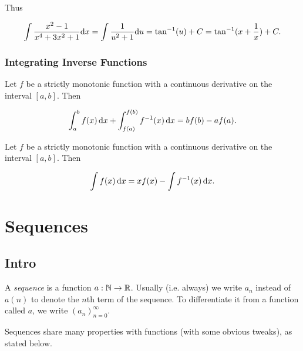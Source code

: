 \documentclass{article}
\begin{document}
{\begin{eg}
      Thus 

      \[
        \int \frac{x^2-1}{x^4+3x^2+1} \mathrm{d} x = \int \frac{1}{u^2 + 1} \mathrm{d} u = \tan^{-1}(u) + C = \tan^{-1}(x + \frac{1}{x}) + C.
      \]
    \end{eg}
    
    \subsubsection*{Integrating Inverse Functions}
    \begin{thm} Let \(f\) be a strictly monotonic function with a continuous derivative on the interval \([a,b]\). Then 

      \[
        \int_{a}^{b}f(x) \, \mathrm{d} x + \int_{f(a)}^{f(b)}f^{-1}(x) \, \mathrm{d} x = bf(b) - af(a).
      \]
    \end{thm}

    \begin{thm} Let \(f\) be a strictly monotonic function with a continuous derivative on the interval \([a,b]\). Then 

      \[
        \int f(x) \, \mathrm{d} x = xf(x) - \int f^{-1}(x) \, \mathrm{d} x.
      \]
      
    \end{thm}

  }

  \pagebreak

  \section{Sequences}
  \subsection{Intro}

  \begin{defi}[Sequence]
    A \emph{sequence} is a function \(a: \mathbb{N} \to \mathbb{R}\). Usually (i.e. always) we write \(a_n\) instead of \(a(n)\) to denote the \(n\)th term of the sequence. To differentiate it from a function called \(a\), we write \((a_n)_{n=0}^{\infty}\). 
    \end{defi}
    Sequences share many properties with functions (with some obvious tweaks), as stated below.
\end{document}
